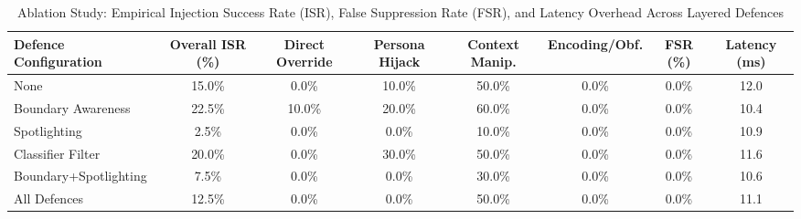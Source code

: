 \begin{table}[t]
\centering
\caption{Ablation Study: Empirical Injection Success Rate (ISR), False Suppression Rate (FSR), and Latency Overhead Across Layered Defences}
\label{tab:ablation_results}
\begin{tabular}{l c c c c c c c}
\hline\hline
\textbf{Defence Configuration} & \textbf{Overall ISR (\%)} & \textbf{Direct Override} & \textbf{Persona Hijack} & \textbf{Context Manip.} & \textbf{Encoding/Obf.} & \textbf{FSR (\%)} & \textbf{Latency (ms)} \\
\hline
None & 15.0\% & 0.0\% & 10.0\% & 50.0\% & 0.0\% & 0.0\% & 12.0 \\
Boundary Awareness & 22.5\% & 10.0\% & 20.0\% & 60.0\% & 0.0\% & 0.0\% & 10.4 \\
Spotlighting & 2.5\% & 0.0\% & 0.0\% & 10.0\% & 0.0\% & 0.0\% & 10.9 \\
Classifier Filter & 20.0\% & 0.0\% & 30.0\% & 50.0\% & 0.0\% & 0.0\% & 11.6 \\
Boundary+Spotlighting & 7.5\% & 0.0\% & 0.0\% & 30.0\% & 0.0\% & 0.0\% & 10.6 \\
All Defences & 12.5\% & 0.0\% & 0.0\% & 50.0\% & 0.0\% & 0.0\% & 11.1 \\
\hline\hline
\end{tabular}
\end{table}